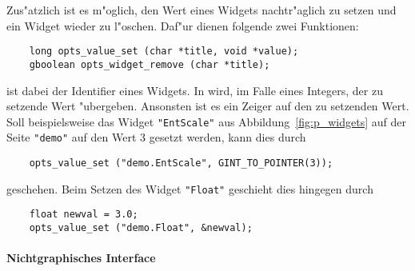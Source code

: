 Zus"atzlich ist es m"oglich, den Wert eines Widgets nachtr"aglich zu
setzen und ein Widget wieder zu l"oschen. Daf"ur dienen folgende
zwei Funktionen:
\begin{small}
\linespread{0.9}
\begin{verbatim}
    long opts_value_set (char *title, void *value);
    gboolean opts_widget_remove (char *title);
\end{verbatim}
\end{small}
 ist dabei der Identifier eines Widgets. In 
wird, im Falle eines Integers, der zu setzende Wert
"ubergeben. Ansonsten ist es ein Zeiger auf den zu setzenden
Wert. Soll beispielsweise das Widget \verb|"EntScale"| aus
Abbildung~\ref{fig:p_widgets} auf der Seite \verb|"demo"| auf den
Wert 3 gesetzt werden, kann dies durch
\begin{small}
\linespread{0.9}
\begin{verbatim}
    opts_value_set ("demo.EntScale", GINT_TO_POINTER(3));
\end{verbatim}
\end{small}
geschehen. Beim Setzen des Widget \verb|"Float"| geschieht dies
hingegen durch
\begin{small}
\linespread{0.9}
\begin{verbatim}
    float newval = 3.0;
    opts_value_set ("demo.Float", &newval);
\end{verbatim}
\end{small}

\paragraph{Nichtgraphisches Interface}\hfill\\

